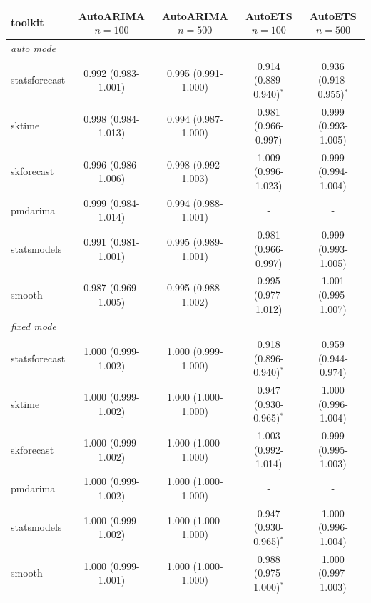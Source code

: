 \begin{tabular}{lcccc}
\toprule
toolkit & AutoARIMA $n=100$ & AutoARIMA $n=500$ & AutoETS $n=100$ & AutoETS $n=500$ \\
\midrule
\multicolumn{5}{l}{\textit{auto mode}} \\
statsforecast & 0.992 (0.983-1.001) & 0.995 (0.991-1.000) & 0.914 (0.889-0.940)$^*$ & 0.936 (0.918-0.955)$^*$ \\
sktime & 0.998 (0.984-1.013) & 0.994 (0.987-1.000) & 0.981 (0.966-0.997) & 0.999 (0.993-1.005) \\
skforecast & 0.996 (0.986-1.006) & 0.998 (0.992-1.003) & 1.009 (0.996-1.023) & 0.999 (0.994-1.004) \\
pmdarima & 0.999 (0.984-1.014) & 0.994 (0.988-1.001) & - & - \\
statsmodels & 0.991 (0.981-1.001) & 0.995 (0.989-1.001) & 0.981 (0.966-0.997) & 0.999 (0.993-1.005) \\
smooth & 0.987 (0.969-1.005) & 0.995 (0.988-1.002) & 0.995 (0.977-1.012) & 1.001 (0.995-1.007) \\
\multicolumn{5}{l}{\textit{fixed mode}} \\
statsforecast & 1.000 (0.999-1.002) & 1.000 (0.999-1.000) & 0.918 (0.896-0.940)$^*$ & 0.959 (0.944-0.974) \\
sktime & 1.000 (0.999-1.002) & 1.000 (1.000-1.000) & 0.947 (0.930-0.965)$^*$ & 1.000 (0.996-1.004) \\
skforecast & 1.000 (0.999-1.002) & 1.000 (1.000-1.000) & 1.003 (0.992-1.014) & 0.999 (0.995-1.003) \\
pmdarima & 1.000 (0.999-1.002) & 1.000 (1.000-1.000) & - & - \\
statsmodels & 1.000 (0.999-1.002) & 1.000 (1.000-1.000) & 0.947 (0.930-0.965)$^*$ & 1.000 (0.996-1.004) \\
smooth & 1.000 (0.999-1.001) & 1.000 (1.000-1.000) & 0.988 (0.975-1.000)$^*$ & 1.000 (0.997-1.003) \\
\bottomrule
\end{tabular}
